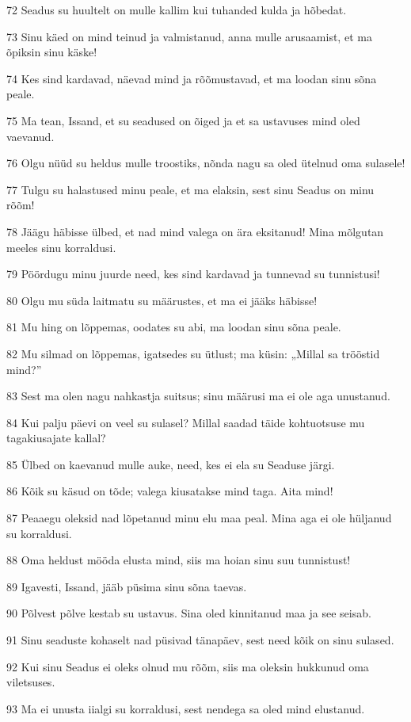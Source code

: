 \par 72 Seadus su huultelt on mulle kallim kui tuhanded kulda ja hõbedat.
\par 73 Sinu käed on mind teinud ja valmistanud, anna mulle arusaamist, et ma õpiksin sinu käske!
\par 74 Kes sind kardavad, näevad mind ja rõõmustavad, et ma loodan sinu sõna peale.
\par 75 Ma tean, Issand, et su seadused on õiged ja et sa ustavuses mind oled vaevanud.
\par 76 Olgu nüüd su heldus mulle troostiks, nõnda nagu sa oled ütelnud oma sulasele!
\par 77 Tulgu su halastused minu peale, et ma elaksin, sest sinu Seadus on minu rõõm!
\par 78 Jäägu häbisse ülbed, et nad mind valega on ära eksitanud! Mina mõlgutan meeles sinu korraldusi.
\par 79 Pöördugu minu juurde need, kes sind kardavad ja tunnevad su tunnistusi!
\par 80 Olgu mu süda laitmatu su määrustes, et ma ei jääks häbisse!
\par 81 Mu hing on lõppemas, oodates su abi, ma loodan sinu sõna peale.
\par 82 Mu silmad on lõppemas, igatsedes su ütlust; ma küsin: „Millal sa trööstid mind?”
\par 83 Sest ma olen nagu nahkastja suitsus; sinu määrusi ma ei ole aga unustanud.
\par 84 Kui palju päevi on veel su sulasel? Millal saadad täide kohtuotsuse mu tagakiusajate kallal?
\par 85 Ülbed on kaevanud mulle auke, need, kes ei ela su Seaduse järgi.
\par 86 Kõik su käsud on tõde; valega kiusatakse mind taga. Aita mind!
\par 87 Peaaegu oleksid nad lõpetanud minu elu maa peal. Mina aga ei ole hüljanud su korraldusi.
\par 88 Oma heldust mööda elusta mind, siis ma hoian sinu suu tunnistust!
\par 89 Igavesti, Issand, jääb püsima sinu sõna taevas.
\par 90 Põlvest põlve kestab su ustavus. Sina oled kinnitanud maa ja see seisab.
\par 91 Sinu seaduste kohaselt nad püsivad tänapäev, sest need kõik on sinu sulased.
\par 92 Kui sinu Seadus ei oleks olnud mu rõõm, siis ma oleksin hukkunud oma viletsuses.
\par 93 Ma ei unusta iialgi su korraldusi, sest nendega sa oled mind elustanud.
